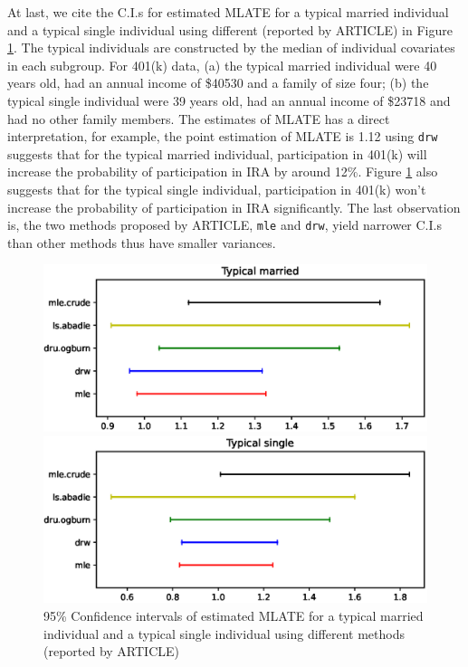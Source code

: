 \documentclass{article}
\begin{document}
At last, we cite the C.I.s for estimated MLATE for a typical married individual and a typical single individual using different (reported by ARTICLE) in Figure \ref*{theirtypical}. The typical individuals are constructed by the median of individual covariates in each subgroup. For 401(k) data, (a) the typical married individual were 40 years old, had an annual income of \$40530 and a family of size four; (b) the typical single individual were 39 years old, had an annual income of \$23718 and had no other family members. The estimates of MLATE has a direct interpretation, for example, the point estimation of MLATE is 1.12 using \texttt{drw} suggests that for the typical married individual, participation in 401(k) will increase the probability of participation in IRA by around 12\%. Figure \ref*{theirtypical} also suggests that for the typical single individual, participation in 401(k) won't increase the probability of participation in IRA significantly. The last observation is, the two methods proposed by ARTICLE, \texttt{mle} and \texttt{drw}, yield narrower C.I.s than other methods thus have smaller variances.
\begin{figure}
\centering
\begin{minipage}{0.48\linewidth}
\includegraphics[width=\linewidth]{typical0.eps}
\end{minipage}
\begin{minipage}{0.48\linewidth}
\includegraphics[width=\linewidth]{typical1.eps}
\end{minipage}
\caption{95\% Confidence intervals of estimated MLATE for a typical married individual and a typical single individual using different methods (reported by ARTICLE)}
\label{theirtypical}
\end{figure}
\end{document}
